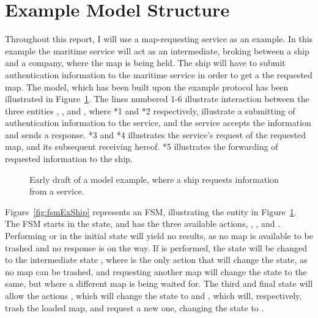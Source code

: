 \section{Example Model Structure}
Throughout this report, I will use a map-requesting service as an example. In this example the maritime service will act as an intermediate, broking between a ship and a company, where the map is being held. The ship will have to submit authentication information to the maritime service in order to get a the requested map. The model, which has been built upon the example protocol has been illustrated in Figure~\ref{fig:modelExProtocol}. The lines numbered 1-6 illustrate interaction between the three entities , , and , where *1 and *2 respectively, illustrate a submitting of authentication information to the service, and the service accepts the information and sends a response. *3 and *4 illustrates the service's request of the requested map, and its subsequent receiving hereof. *5 illustrates the forwarding of requested information to the ship.
\begin{figure}[h!]
  \centering
  \caption{Early draft of a model example, where a ship requests information from a service.}
  \label{fig:modelExProtocol}
\end{figure}
Figure~\ref{fig:fsmExShip} represents an FSM, illustrating the  entity in Figure~\ref{fig:modelExProtocol}. The FSM starts in the  state, and has the three available actions, , , and . Performing  or  in the initial state will yield no results, as no map is available to be trashed and no response is on the way. If  is performed, the state will be changed to the intermediate state , where  is the only action that will change the state, as no map can be trashed, and requesting another map will change the state to the same, but where a different map is being waited for. The third and final state  will allow the actions , which will change the state to  and , which will, respectively, trash the loaded map, and request a new one, changing the state to .

